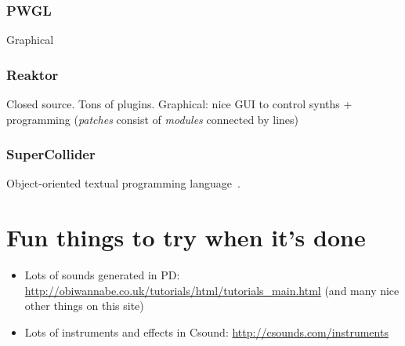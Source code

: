 \documentclass[a4paper,titlepage]{article}
\begin{document}
\subsubsection{PWGL}
\cite{pwgl}
Graphical

\subsubsection{Reaktor}
\cite{reaktor} Closed source. Tons of plugins. Graphical: nice GUI to control
synths + programming (\emph{patches} consist of \emph{modules} connected by
lines)

\subsubsection{SuperCollider}
Object-oriented textual programming language~\cite{supercollider}.

\section{Fun things to try when it's done}
\begin{itemize}
\item Lots of sounds generated in PD:
  \url{http://obiwannabe.co.uk/tutorials/html/tutorials_main.html}
  (and many nice other things on this site)
\item Lots of instruments and effects in Csound:
  \url{http://csounds.com/instruments}
\end{itemize}



\end{document}
